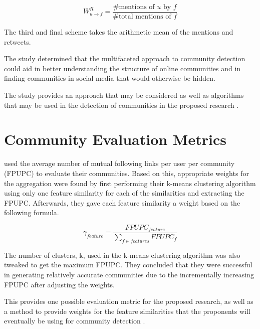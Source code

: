 \begin{equation}
W_{u \to f}^{R} = \frac{\text{\# mentions of $u$ by $f$}}{\text{\# total mentions of $f$}}
\end{equation}

The third and final scheme takes the arithmetic mean of the mentions and retweets.

The study determined that the multifaceted approach to community detection could aid in better understanding the structure of online communities and in finding communities in social media that would otherwise be hidden.

The study provides an approach that may be considered as well as algorithms that may be used in the detection of communities in the proposed research \cite{Darmon:2015}.

\section{Community Evaluation Metrics}

 used the average number of mutual following links per user per community (FPUPC) to evaluate their communities. Based on this, appropriate weights for the aggregation were found by first performing their k-means clustering algorithm using only one feature similarity for each of the similarities and extracting the FPUPC. Afterwards, they gave each feature similarity a weight based on the following formula. 

\begin{equation}
\gamma_{feature} = \frac{FPUPC_{feature}}{\sum_{f \in features} FPUPC_f}
\end{equation}

The number of clusters, k, used in the k-means clustering algorithm was also tweaked to get the maximum FPUPC. They concluded that they were successful in generating relatively accurate communities due to the incrementally increasing FPUPC after adjusting the weights.

This provides one possible evaluation metric for the proposed research, as well as a method to provide weights for the feature similarities that the proponents will eventually be using for community detection \cite{Zhang:2012}.